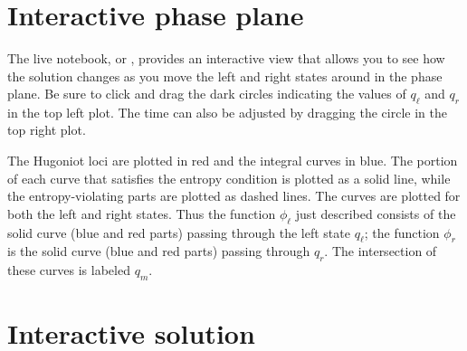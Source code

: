 \documentclass{SIAMbook2016}
\begin{document}
    \begin{center}
    \end{center}
    { \hspace*{\fill} \\}
    
    \begin{center}
    \end{center}
    { \hspace*{\fill} \\}
    
    \begin{center}
    \end{center}
    { \hspace*{\fill} \\}
    
\hypertarget{interactive-phase-plane}{%
\section{Interactive phase plane}\label{interactive-phase-plane}}

The live notebook, or
, provides an interactive view that allows you to see how the
solution changes as you move the left and right states around in the
phase plane. Be sure to click and drag the dark circles indicating the
values of \(q_\ell\) and \(q_r\) in the top left plot. The time can also
be adjusted by dragging the circle in the top right plot.

The Hugoniot loci are plotted in red and the integral curves in blue.
The portion of each curve that satisfies the entropy condition is
plotted as a solid line, while the entropy-violating parts are plotted
as dashed lines. The curves are plotted for both the left and right
states. Thus the function \(\phi_\ell\) just described consists of the
solid curve (blue and red parts) passing through the left state
\(q_\ell\); the function \(\phi_r\) is the solid curve (blue and red
parts) passing through \(q_r\). The intersection of these curves is
labeled \(q_m\).

\hypertarget{interactive-solution}{%
\section{Interactive solution}\label{interactive-solution}}
\end{document}
